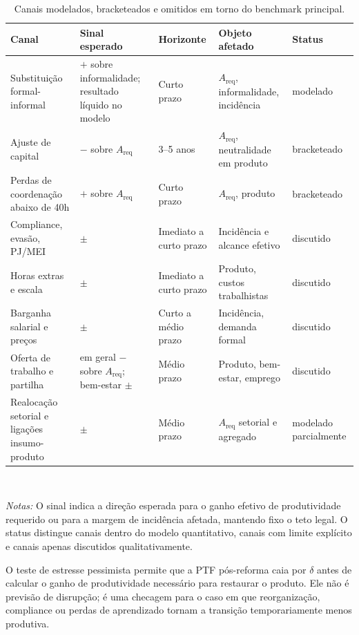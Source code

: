 \documentclass[12pt,a4paper]{article}
\begin{document}
\begin{table}[htbp]
\centering
\caption{Canais modelados, bracketeados e omitidos em torno do benchmark principal.}\label{tab:omitted_channels}
\small
\begin{tabular}{@{}p{3.0cm}p{2.5cm}p{2.2cm}p{3.0cm}p{1.9cm}@{}}
\hline\hline
Canal & Sinal esperado & Horizonte & Objeto afetado & Status \\
\hline
Substitui\c{c}\~ao formal-informal & $+$ sobre informalidade; resultado l\'iquido no modelo & Curto prazo & $A_{\text{req}}$, informalidade, incid\^encia & modelado \\
Ajuste de capital & $-$ sobre $A_{\text{req}}$ & 3--5 anos & $A_{\text{req}}$, neutralidade em produto & bracketeado \\
Perdas de coordena\c{c}\~ao abaixo de 40h & $+$ sobre $A_{\text{req}}$ & Curto prazo & $A_{\text{req}}$, produto & bracketeado \\
Compliance, evas\~ao, PJ/MEI & $\pm$ & Imediato a curto prazo & Incid\^encia e alcance efetivo & discutido \\
Horas extras e escala & $\pm$ & Imediato a curto prazo & Produto, custos trabalhistas & discutido \\
Barganha salarial e pre\c{c}os & $\pm$ & Curto a m\'edio prazo & Incid\^encia, demanda formal & discutido \\
Oferta de trabalho e partilha & em geral $-$ sobre $A_{\text{req}}$; bem-estar $\pm$ & M\'edio prazo & Produto, bem-estar, emprego & discutido \\
Realoca\c{c}\~ao setorial e liga\c{c}\~oes insumo-produto & $\pm$ & M\'edio prazo & $A_{\text{req}}$ setorial e agregado & modelado parcialmente \\
\hline\hline
\end{tabular}
\\[2pt]
\begin{minipage}{0.95\textwidth}
\justifying
{\footnotesize \textit{Notas:} O sinal indica a dire\c{c}\~ao esperada para o ganho efetivo de produtividade requerido ou para a margem de incid\^encia afetada, mantendo fixo o teto legal. O status distingue canais dentro do modelo quantitativo, canais com limite expl\'icito e canais apenas discutidos qualitativamente.}
\end{minipage}
\end{table}

O teste de estresse pessimista permite que a PTF p\'os-reforma caia por $\delta$ antes de calcular o ganho de produtividade necess\'ario para restaurar o produto. Ele n\~ao \'e previs\~ao de disrup\c{c}\~ao; \'e uma checagem para o caso em que reorganiza\c{c}\~ao, compliance ou perdas de aprendizado tornam a transi\c{c}\~ao temporariamente menos produtiva.
\end{document}
